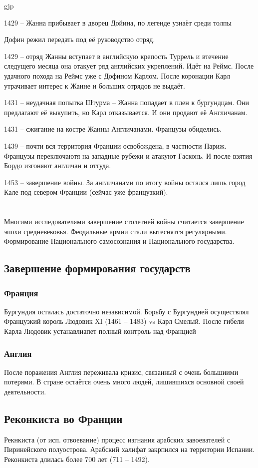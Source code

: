 gjp	 \documentclass[12pt,a4paper]{article}
\begin{document}
1429 -- Жанна прибывает в дворец Дойина, по легенде узнаёт среди толпы

Дофин режил передать под её руководство отряд.

1429 -- отряд Жанны вступает в английскую крепость Туррель и втечение следущего месяца она отакует ряд английских укреплений. Идёт на Реймс. После удачного похода на Реймс уже с Дофином Карлом. После коронации Карл утрачивает интерес к Жанне и больших отрядов не выдаёт.

1431 -- неудачная попытка Штурма -- Жанна попадает в плен к бургундцам. Они предлагают её выкупить, но Карл отказывается. И они продают её Англичанам.

1431 -- сжигание на костре Жанны Англичанами. Французы обиделись.

1439 -- почти вся территория Франции освобождена, в частности Париж. Французы переключаютя на западные рубежи и атакуют Гасконь. И после взятия Бордо изгоняют англичан и оттуда. 

1453 -- завершение войны. За англичанами по итогу войны остался лишь город Кале под севером Франции (сейчас уже французкий).
\\\\\\
Многими исследователями завершение столетней войны считается завершение эпохи средневековья. Феодальные армии стали вытеснятся регулярными. Формирование Национального самосознания и Национального государства.

\subsection{Завершение формирования государств}
\subsubsection{Франция}

Бургундия осталась достаточно независимой. Борьбу с Бургундией осуществлял Французкий король Людовик XI (1461 -- 1483) vs Карл Смелый. После гибели Карла Людовик устанавлиапет полный контроль над Францией

\subsubsection{Англия}
После поражения Англия переживала кризис, связанный с очень большиими потерями. В стране остаётся очень много людей, лишившихся основной своей деятельности.

\subsection{Реконкиста во Франции}
Рекнкиста (от исп. отвоевание) процесс изгнания арабских завоевателей с Пиринейского полуострова. Арабский халифат закрпился на территории Испании. 
Реконкиста длилась более 700 лет (711 -- 1492).
\end{document}
